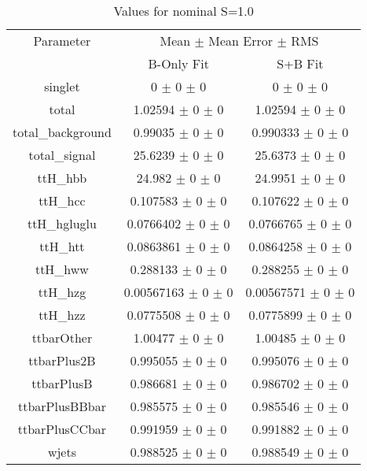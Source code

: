 \begin{table}
\centering
\caption{Values for nominal S=1.0}
\begin{tabular}{ccc}
\toprule
Parameter 	& \multicolumn{2}{c}{Mean $\pm$ Mean Error $\pm$ RMS}\\
 	& B-Only Fit & S+B Fit\\
\midrule
singlet 	& \num{0} $\pm$ \num{0} $\pm$ \num{0} 	& \num{0} $\pm$ \num{0} $\pm$ \num{0}\\
total 	& \num{1.02594} $\pm$ \num{0} $\pm$ \num{0} 	& \num{1.02594} $\pm$ \num{0} $\pm$ \num{0}\\
total\_background 	& \num{0.99035} $\pm$ \num{0} $\pm$ \num{0} 	& \num{0.990333} $\pm$ \num{0} $\pm$ \num{0}\\
total\_signal 	& \num{25.6239} $\pm$ \num{0} $\pm$ \num{0} 	& \num{25.6373} $\pm$ \num{0} $\pm$ \num{0}\\
ttH\_hbb 	& \num{24.982} $\pm$ \num{0} $\pm$ \num{0} 	& \num{24.9951} $\pm$ \num{0} $\pm$ \num{0}\\
ttH\_hcc 	& \num{0.107583} $\pm$ \num{0} $\pm$ \num{0} 	& \num{0.107622} $\pm$ \num{0} $\pm$ \num{0}\\
ttH\_hgluglu 	& \num{0.0766402} $\pm$ \num{0} $\pm$ \num{0} 	& \num{0.0766765} $\pm$ \num{0} $\pm$ \num{0}\\
ttH\_htt 	& \num{0.0863861} $\pm$ \num{0} $\pm$ \num{0} 	& \num{0.0864258} $\pm$ \num{0} $\pm$ \num{0}\\
ttH\_hww 	& \num{0.288133} $\pm$ \num{0} $\pm$ \num{0} 	& \num{0.288255} $\pm$ \num{0} $\pm$ \num{0}\\
ttH\_hzg 	& \num{0.00567163} $\pm$ \num{0} $\pm$ \num{0} 	& \num{0.00567571} $\pm$ \num{0} $\pm$ \num{0}\\
ttH\_hzz 	& \num{0.0775508} $\pm$ \num{0} $\pm$ \num{0} 	& \num{0.0775899} $\pm$ \num{0} $\pm$ \num{0}\\
ttbarOther 	& \num{1.00477} $\pm$ \num{0} $\pm$ \num{0} 	& \num{1.00485} $\pm$ \num{0} $\pm$ \num{0}\\
ttbarPlus2B 	& \num{0.995055} $\pm$ \num{0} $\pm$ \num{0} 	& \num{0.995076} $\pm$ \num{0} $\pm$ \num{0}\\
ttbarPlusB 	& \num{0.986681} $\pm$ \num{0} $\pm$ \num{0} 	& \num{0.986702} $\pm$ \num{0} $\pm$ \num{0}\\
ttbarPlusBBbar 	& \num{0.985575} $\pm$ \num{0} $\pm$ \num{0} 	& \num{0.985546} $\pm$ \num{0} $\pm$ \num{0}\\
ttbarPlusCCbar 	& \num{0.991959} $\pm$ \num{0} $\pm$ \num{0} 	& \num{0.991882} $\pm$ \num{0} $\pm$ \num{0}\\
wjets 	& \num{0.988525} $\pm$ \num{0} $\pm$ \num{0} 	& \num{0.988549} $\pm$ \num{0} $\pm$ \num{0}\\
\bottomrule
\end{tabular}
\end{table}